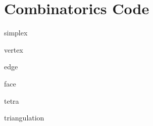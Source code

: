                       

\chapter{Combinatorics Code}

\begin{description}
\item[simplex] 
\end{description}

\bigskip 

\begin{description}
\item[vertex] 
\end{description}

\bigskip 

\begin{description}
\item[edge] 
\end{description}

\bigskip 

\begin{description}
\item[face] 
\end{description}

\bigskip 

\begin{description}
\item[tetra] 
\end{description}

\bigskip 

\begin{description}
\item[triangulation] 
\end{description}
